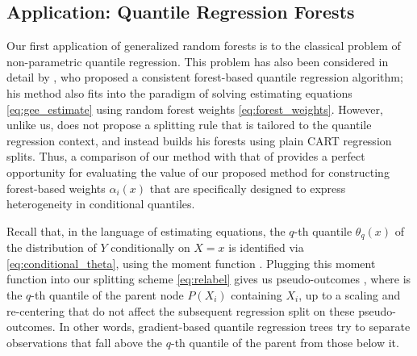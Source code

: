 \documentclass[aos]{imsart}
\theoremstyle{plain}
\theoremstyle{definition}
\theoremstyle{remark}
\begin{document}
\begin{CJK}{UTF8}{gbsn}
\section{Application: Quantile Regression Forests}
\label{sec:quantile}

Our first application of generalized random forests is to the classical problem of non-parametric quantile regression.
This problem has also been considered in detail by
\citet{meinshausen2006quantile}, who proposed a consistent forest-based quantile regression
algorithm; his method also fits into the paradigm of solving estimating equations \eqref{eq:gee_estimate}
using random forest weights \eqref{eq:forest_weights}. However, unlike us, \citet{meinshausen2006quantile}
does not propose a splitting rule that is tailored to the quantile regression context, and instead
builds his forests using plain CART regression splits. Thus, a comparison of our method with that of
\citet{meinshausen2006quantile} provides a perfect opportunity for evaluating the value of our
proposed method for constructing forest-based weights $\alpha_i(x)$ that are specifically designed
to express heterogeneity in conditional quantiles.

Recall that, in the language of estimating equations, the $q$-th quantile $\theta_q(x)$
of the distribution of $Y$ conditionally on $X = x$ is identified via \eqref{eq:conditional_theta}, 
using the moment function
.
Plugging this moment function into our splitting scheme \eqref{eq:relabel} gives us pseudo-outcomes
, where  is the $q$-th quantile of the parent node $P(X_i)$
containing $X_i$,
up to a scaling and re-centering that do not affect the subsequent regression split on these
pseudo-outcomes.
In other words, gradient-based quantile regression trees try to separate observations that
fall above the $q$-th quantile of the parent from those below it.


\end{CJK}
\end{document}
